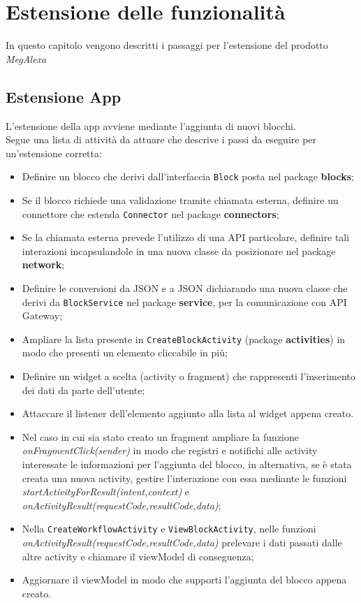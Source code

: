 \chapter{Estensione delle funzionalità}\label{estensione}
In questo capitolo vengono descritti i passaggi per l'estensione del prodotto \textit{MegAlexa}

\section{Estensione App}
L'estensione della app avviene mediante l'aggiunta di nuovi blocchi.\\
Segue una lista di attività da attuare che descrive i passi da eseguire per un'estensione corretta:

\begin{itemize}
	\item Definire un blocco che derivi dall'interfaccia \texttt{Block} posta nel package \textbf{blocks};
	\item Se il blocco richiede una validazione tramite chiamata esterna, definire un connettore che estenda \texttt{Connector} nel package \textbf{connectors};
	\item Se la chiamata esterna prevede l'utilizzo di una API particolare, definire tali interazioni incapsulandole in una nuova classe da posizionare nel package \textbf{network};
	\item Definire le conversioni da JSON e a JSON dichiarando una nuova classe che derivi da \texttt{BlockService} nel package \textbf{service}, per la comunicazione con API Gateway;
	\item Ampliare la lista presente in \texttt{CreateBlockActivity} (package \textbf{activities}) in modo che presenti un elemento cliccabile in più;
	\item Definire un widget a scelta (activity o fragment) che rappresenti l'inserimento dei dati da parte dell'utente;
	\item Attaccare il listener dell'elemento aggiunto alla lista al widget appena creato.
	\item Nel caso in cui sia stato creato un fragment ampliare la funzione \textit{onFragmentClick(sender)} in modo che registri e notifichi alle activity interessate le informazioni per l'aggiunta del blocco, in alternativa, se è stata creata una nuova activity, gestire l'interazione con essa mediante le funzioni \textit{startActivityForResult(intent,context)} e \textit{onActivityResult(requestCode,resultCode,data)};
	\item Nella \texttt{CreateWorkflowActivity} e \texttt{ViewBlockActivity}, nelle funzioni \textit{onActivityResult(requestCode,resultCode,data)} 	prelevare i dati passati dalle altre activity e chiamare il viewModel di conseguenza;
	\item Aggiornare il viewModel in modo che supporti l'aggiunta del blocco appena creato.
\end{itemize}



